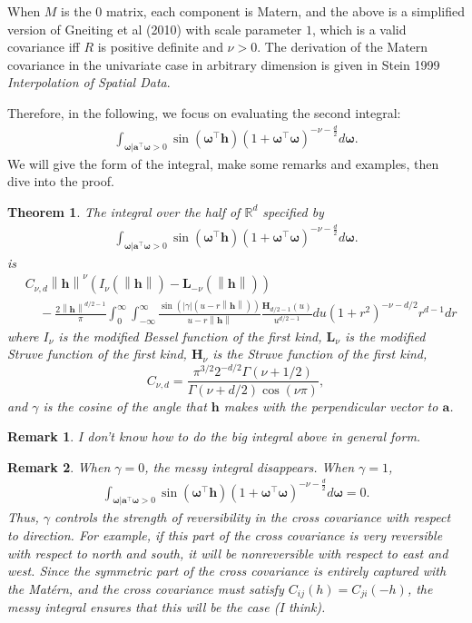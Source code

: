 \documentclass[11pt]{article}
\newtheorem{theorem}{Theorem}
\newtheorem*{remark}{Remark}
\newcommand{\vint}{\boldsymbol{\omega}}
\newcommand{\vpla}{\boldsymbol{a}}
\newcommand{\hh}{\left\lVert \boldsymbol{h}\right\rVert}
\begin{document}
When $M$ is the $0$ matrix, each component is Matern, and the above is a simplified version of Gneiting et al (2010) with scale parameter $1$, which is a valid covariance iff $R$ is positive definite and $\nu > 0$. The derivation of the Matern covariance in the univariate case in arbitrary dimension is given in Stein 1999 \textit{Interpolation of Spatial Data}.



 Therefore, in the following, we focus on evaluating the second integral: \begin{align}
\int_{\vint | \vpla^\top\vint > 0}\sin(\vint^\top \boldsymbol{h})(1 + \vint^\top \vint)^{-\nu- \frac{d}{2}} d\vint. \label{toughintegral}
\end{align}We will give the form of the integral, make some remarks and examples, then dive into the proof.

\begin{theorem}
The integral over the half of $\mathbb{R}^d$ specified by \begin{align}
\int_{\vint | \vpla^\top\vint > 0}\sin(\vint^\top \boldsymbol{h})(1 + \vint^\top \vint)^{-\nu- \frac{d}{2}} d\vint. \label{toughintegral}
\end{align} is \begin{align}
&C_{\nu, d} \hh^{\nu}\left(I_\nu(\hh) - \boldsymbol{L}_{-\nu}(\hh)\right) \\
& \ \ \ \ \  -\frac{2\hh^{d/2 - 1}}{\pi}\int_0^\infty \int_{-\infty}^\infty \frac{\sin(|\gamma|(u-r\hh))}{u-r\hh}\frac{\boldsymbol{H}_{d/2 - 1}(u)}{u^{d/2-1}} du (1+ r^2)^{-\nu-d/2} r^{d-1}dr
\end{align}where $I_\nu$ is the modified Bessel function of the first kind, $\boldsymbol{L}_\nu$ is the modified Struve function of the first kind, $\boldsymbol{H}_\nu$ is the Struve function of the first kind, $$C_{\nu,d} = \frac{\pi^{3/2}2^{-d/2}\Gamma(\nu + 1/2)}{\Gamma(\nu + d/2) \cos(\nu\pi)},$$ and $\gamma$ is the cosine of the angle that $\boldsymbol{h}$ makes with the perpendicular vector to $\boldsymbol{a}$.
\end{theorem}

\begin{remark}
I don't know how to do the big integral above in general form. 
\end{remark}

\begin{remark}
When $\gamma=0$, the messy integral disappears. When $\gamma=1$, \begin{align*}
\int_{\vint | \vpla^\top\vint > 0}\sin(\vint^\top \boldsymbol{h})(1 + \vint^\top \vint)^{-\nu- \frac{d}{2}} d\vint =0.
\end{align*}Thus, $\gamma$ controls the strength of reversibility in the cross covariance with respect to direction. For example, if this part of the cross covariance is very reversible with respect to north and south, it will be nonreversible with respect to east and west. Since the symmetric part of the cross covariance is entirely captured with the Mat\'ern, and the cross covariance must satisfy $C_{ij}(h) = C_{ji}(-h)$, the messy integral ensures that this will be the case (I think).
\end{remark}
\end{document}
